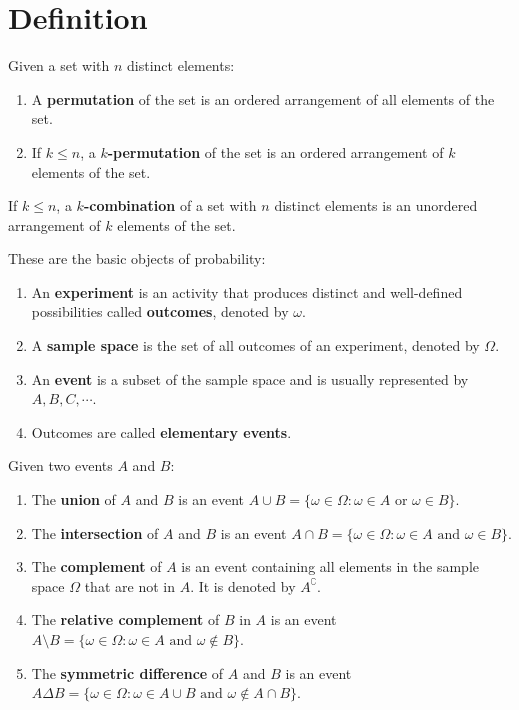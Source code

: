 \documentclass{huhtakm-template-book-v2}
\begin{document}
\section*{Definition}
    \begin{sdefn}
        Given a set with $n$ distinct elements:
        \begin{enumerate}
            \item A \textbf{permutation} of the set is an ordered arrangement of all elements of the set.
            \item If $k \leq n$, a \textbf{$k$-permutation} of the set is an ordered arrangement of $k$ elements of the set.
        \end{enumerate}
    \end{sdefn}
    \begin{sdefn}
        If $k \leq n$, a \textbf{$k$-combination} of a set with $n$ distinct elements is an unordered arrangement of $k$ elements of the set.
    \end{sdefn}
    \begin{sdefn}
        These are the basic objects of probability:
        \begin{enumerate}
            \item An \textbf{experiment} is an activity that produces distinct and well-defined possibilities called \textbf{outcomes}, denoted by $\omega$.
            \item A \textbf{sample space} is the set of all outcomes of an experiment, denoted by $\Omega$.
            \item An \textbf{event} is a subset of the sample space and is usually represented by $A, B, C, \cdots$.
            \item Outcomes are called \textbf{elementary events}.
        \end{enumerate}	
    \end{sdefn}
    \begin{sdefn}
        Given two events $A$ and $B$:
        \begin{enumerate}
            \item The \textbf{union} of $A$ and $B$ is an event $A \cup B = \{\omega \in \Omega : \omega \in A \text{ or } \omega \in B\}$.
            \item The \textbf{intersection} of $A$ and $B$ is an event $A \cap B = \{\omega \in \Omega : \omega \in A \text{ and } \omega \in B\}$.
            \item The \textbf{complement} of $A$ is an event containing all elements in the sample space $\Omega$ that are not in $A$. It is denoted by $A^{\complement}$.
            \item The \textbf{relative complement} of $B$ in $A$ is an event $A \setminus B = \{\omega \in \Omega : \omega \in A \text{ and } \omega \not \in B\}$.
            \item The \textbf{symmetric difference} of $A$ and $B$ is an event $A \Delta B = \{\omega \in \Omega : \omega \in A \cup B \text{ and } \omega \not \in A \cap B\}$.
        \end{enumerate}
    \end{sdefn}
\end{document}
